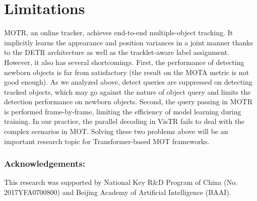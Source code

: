 \documentclass[runningheads]{llncs}
\begin{document}
\section{Limitations}
MOTR, an online tracker, achieves end-to-end multiple-object tracking. It implicitly learns the appearance and position variances in a joint manner thanks to the DETR architecture as well as the tracklet-aware label assignment. However, it also has several shortcomings. First, the performance of detecting newborn objects is far from satisfactory (the result on the MOTA metric is not good enough). As we analyzed above, detect queries are suppressed on detecting tracked objects, which may go against the nature of object query and limits the detection performance on newborn objects. Second, the query passing in MOTR is performed frame-by-frame, limiting the efficiency of model learning during training. In our practice, the parallel decoding in VisTR \cite{vistr2021} fails to deal with the complex scenarios in MOT. Solving these two problems above will be an important research topic for Transformer-based MOT frameworks.

\subsubsection{Acknowledgements:} This research was supported by National Key R\&D Program of China (No. 2017YFA0700800) and Beijing Academy of Artificial Intelligence (BAAI).




\end{document}

